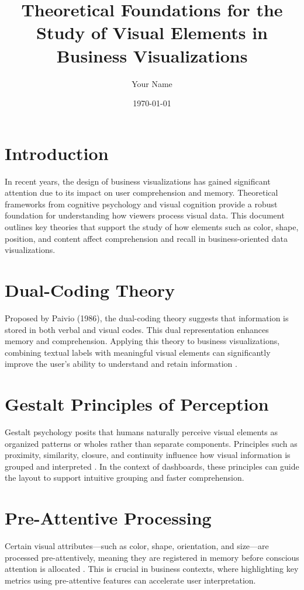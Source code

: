 \documentclass[12pt]{article}
\title{Theoretical Foundations for the Study of Visual Elements in Business Visualizations}
\author{Your Name}
\date{\today}
\begin{document}
\maketitle
\onehalfspacing

\section{Introduction}
In recent years, the design of business visualizations has gained significant attention due to its impact on user comprehension and memory. Theoretical frameworks from cognitive psychology and visual cognition provide a robust foundation for understanding how viewers process visual data. This document outlines key theories that support the study of how elements such as color, shape, position, and content affect comprehension and recall in business-oriented data visualizations.

\section{Dual-Coding Theory}
Proposed by Paivio (1986), the dual-coding theory suggests that information is stored in both verbal and visual codes. This dual representation enhances memory and comprehension. Applying this theory to business visualizations, combining textual labels with meaningful visual elements can significantly improve the user's ability to understand and retain information \parencite{paivio1986}.

\section{Gestalt Principles of Perception}
Gestalt psychology posits that humans naturally perceive visual elements as organized patterns or wholes rather than separate components. Principles such as proximity, similarity, closure, and continuity influence how visual information is grouped and interpreted \parencite{koffka1935}. In the context of dashboards, these principles can guide the layout to support intuitive grouping and faster comprehension.

\section{Pre-Attentive Processing}
Certain visual attributes—such as color, shape, orientation, and size—are processed pre-attentively, meaning they are registered in memory before conscious attention is allocated \parencite{healey1996}. This is crucial in business contexts, where highlighting key metrics using pre-attentive features can accelerate user interpretation.
\end{document}
